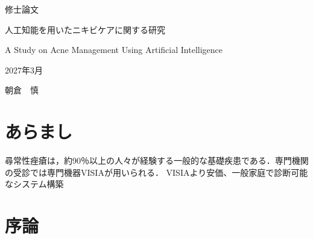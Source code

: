 \documentclass[book,paper=a4,fontsize=16pt,openany]{jlreq}
\begin{document}
\begin{titlepage}
    \centering
    \vspace*{20mm}
    {\huge 修士論文\par}

    \vspace{25mm}
    {\huge 人工知能を用いたニキビケアに関する研究\par}
    
    \vspace{15mm}
    {\huge A Study on Acne Management Using Artificial Intelligence\par}
    
    \vfill
    
    {\huge 2027年3月\par}
    \vspace{20mm}
    
    {\huge 朝倉　慎\par}
    \vspace{20mm}
\end{titlepage}

\frontmatter
{}
\chapter*{あらまし}
尋常性痤瘡は，約90％以上の人々が経験する一般的な基礎疾患である．専門機関の受診では専門機器VISIAが用いられる．
VISIAより安価、一般家庭で診断可能なシステム構築
\clearpage

\tableofcontents
\clearpage

\mainmatter


\chapter{序論}
\end{document}
